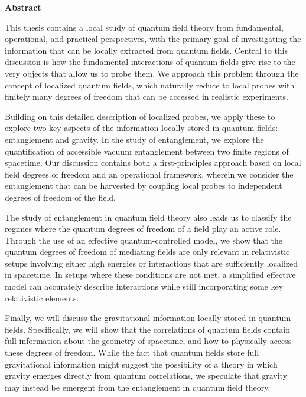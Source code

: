 \documentclass[letterpaper,12pt,titlepage,oneside,final]{book}
\let\origdoublepage\cleardoublepage
\newcommand{\clearemptydoublepage}{%
  \clearpage{\pagestyle{empty}\origdoublepage}}
\let\cleardoublepage\clearemptydoublepage
\begin{document}
\cleardoublepage
{}    %


\begin{center}\textbf{Abstract}\end{center}


This thesis contains a local study of quantum field theory from fundamental, operational, and practical perspectives, with the primary goal of investigating the information that can be locally extracted from quantum fields. Central to this discussion is how the fundamental interactions of quantum fields give rise to the very objects that allow us to probe them. We approach this problem through the concept of localized quantum fields, which naturally reduce to local probes with finitely many degrees of freedom that can be accessed in realistic experiments.

Building on this detailed description of localized probes, we apply these to explore two key aspects of the information locally stored in quantum fields: entanglement and gravity. In the study of entanglement, we explore the quantification of accessible vacuum entanglement between two finite regions of spacetime. Our discussion contains both a first-principles approach based on local field degrees of freedom and an operational framework, wherein we consider the entanglement that can be harvested by coupling local probes to independent degrees of freedom of the field.

The study of entanglement in quantum field theory also leads us to classify the regimes where the quantum degrees of freedom of a field play an active role. Through the use of an effective quantum-controlled model, we show that the quantum degrees of freedom of mediating fields are only relevant in relativistic setups involving either high energies or interactions that are sufficiently localized in spacetime. In setups where these conditions are not met, a simplified effective model can accurately describe interactions while still incorporating some key relativistic elements.

Finally, we will discuss the gravitational information locally stored in quantum fields. Specifically, we will show that the correlations of quantum fields contain full information about the geometry of spacetime, and how to physically access these degrees of freedom.  While the fact that quantum fields store full gravitational information might suggest the possibility of a theory in which gravity emerges directly from quantum correlations, we speculate that gravity may instead be emergent from the entanglement in quantum field theory.
\end{document}
